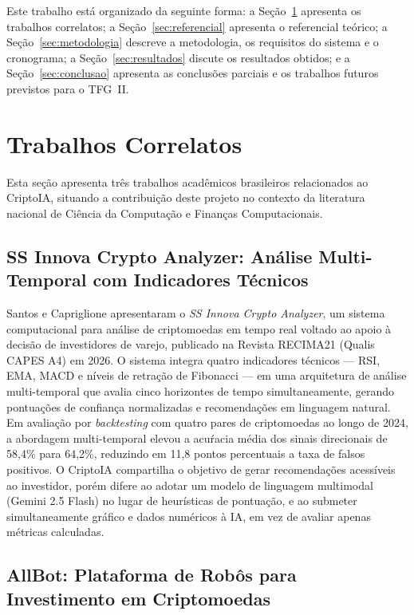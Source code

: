 \documentclass[conference]{IEEEtran}
\begin{document}
Este trabalho está organizado da seguinte forma: a Seção~\ref{sec:correlatos} apresenta os trabalhos correlatos; a Seção~\ref{sec:referencial} apresenta o referencial teórico; a Seção~\ref{sec:metodologia} descreve a metodologia, os requisitos do sistema e o cronograma; a Seção~\ref{sec:resultados} discute os resultados obtidos; e a Seção~\ref{sec:conclusao} apresenta as conclusões parciais e os trabalhos futuros previstos para o TFG~II.


\section{Trabalhos Correlatos}
\label{sec:correlatos}

Esta se\c{c}\~ao apresenta tr\^es trabalhos acad\^emicos brasileiros relacionados ao CriptoIA, situando a contribui\c{c}\~ao deste projeto no contexto da literatura nacional de Ci\^encia da Computa\c{c}\~ao e Finan\c{c}as Computacionais.

\subsection{SS Innova Crypto Analyzer: An\'alise Multi-Temporal com Indicadores T\'ecnicos}

Santos e Capriglione \cite{monteiro2026ssinnova} apresentaram o \textit{SS Innova Crypto Analyzer}, um sistema computacional para an\'alise de criptomoedas em tempo real voltado ao apoio \`{a} decis\~ao de investidores de varejo, publicado na Revista RECIMA21 (Qualis CAPES A4) em 2026. O sistema integra quatro indicadores t\'ecnicos --- RSI, EMA, MACD e n\'iveis de retra\c{c}\~ao de Fibonacci --- em uma arquitetura de an\'alise multi-temporal que avalia cinco horizontes de tempo simultaneamente, gerando pontua\c{c}\~oes de confian\c{c}a normalizadas e recomenda\c{c}\~oes em linguagem natural. Em avalia\c{c}\~ao por \textit{backtesting} com quatro pares de criptomoedas ao longo de 2024, a abordagem multi-temporal elevou a acu\'racia m\'edia dos sinais direcionais de 58,4\% para 64,2\%, reduzindo em 11,8 pontos percentuais a taxa de falsos positivos. O CriptoIA compartilha o objetivo de gerar recomenda\c{c}\~oes acess\'iveis ao investidor, por\'em difere ao adotar um modelo de linguagem multimodal (Gemini 2.5 Flash) no lugar de heur\'isticas de pontua\c{c}\~ao, e ao submeter simultaneamente gr\'afico e dados num\'ericos \`{a} IA, em vez de avaliar apenas m\'etricas calculadas.

\subsection{AllBot: Plataforma de Rob\^{o}s para Investimento em Criptomoedas}
\end{document}
